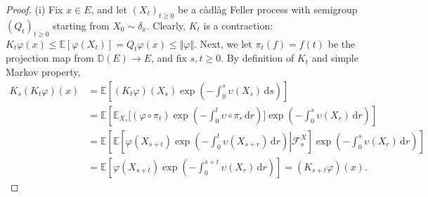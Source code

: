 \documentclass{article}
\numberwithin{equation}{section}
\newcommand{\E}{\mathbb{E}}
\renewcommand{\d}{\mathrm{d}}
\theoremstyle{plain}
\theoremstyle{definition}
\begin{document}
\begin{proof}
(i) Fix $x\in E$, and let $(X_t)_{t\geq 0}$ be a càdlàg Feller process with semigroup $(Q_t)_{t\geq 0}$ starting from $X_0\sim\delta_x$. Clearly, $K_t$ is a contraction: $K_t\varphi(x)\leq\E\left[\varphi(X_t)\right]=Q_t\varphi(x)\leq\Vert\varphi\Vert$. Next, we let $\pi_t(f)=f(t)$ be the projection map from $\mathbb{D}(E)\to E$, and fix $s,t\geq 0$. By definition of $K_t$ and simple Markov property,
\begin{align*}
	K_s(K_t\varphi)(x) &= \E\left[(K_t\varphi)(X_s)\exp\left(-\int_0^s\upsilon(X_s)\,\d s\right)\right]\\
	&=\E\left[\E_{X_s}\biggl[(\varphi\circ \pi_t)\exp\left(-\int_0^t\upsilon\circ\pi_r\,\d r\right)\biggr]\exp\left(-\int_0^s\upsilon(X_r)\,\d r\right)\right]\\
	&=\E\left[\E\left[\left.\varphi(X_{s+t})\exp\left(-\int_0^t\upsilon(X_{s+r})\,\d r\right)\right|\mathscr{F}_s^X\right]\exp\left(-\int_0^s\upsilon(X_r)\,\d r\right)\right]\\
	&=\E\left[\varphi(X_{s+t})\exp\left(-\int_0^{s+t}\upsilon(X_{r})\,\d r\right)\right] = (K_{s+t}\varphi)(x).
\end{align*}


\end{proof}
\end{document}
